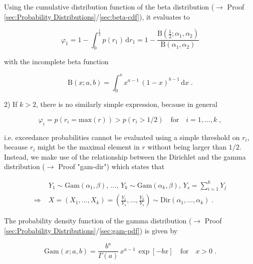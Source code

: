 \documentclass[a4paper,12pt,twoside]{book}
\begin{document}
Using the cumulative distribution function of the beta distribution ($\rightarrow$ Proof \ref{sec:Probability Distributions}/\ref{sec:beta-cdf}), it evaluates to

\begin{equation} \label{eq:dir-ep-Dir2-EP-qed}
\varphi_1 = 1 - \int_0^{\frac{1}{2}} p(r_1) \, \mathrm{d}r_1 = 1 - \frac{\mathrm{B}\left( \frac{1}{2};\alpha_1,\alpha_2 \right)}{\mathrm{B}(\alpha_1,\alpha_2)}
\end{equation}

with the incomplete beta function

\begin{equation} \label{eq:dir-ep-inc-beta-fct}
\mathrm{B}(x; a, b) = \int_0^x x^{a-1} \, (1-x)^{b-1} \, \mathrm{d}x \; .
\end{equation}

\vspace{1em}
2) If $k > 2$, there is no similarly simple expression, because in general

\begin{equation} \label{eq:dir-ep-Dir-EP-ineq}
\varphi_i = p(r_i = \mathrm{max}(r)) > p(r_i > 1/2) \quad \text{for} \quad i = 1, \ldots, k \; ,
\end{equation}

i.e. exceedance probabilities cannot be evaluated using a simple threshold on $r_i$, because $r_i$ might be the maximal element in $r$ without being larger than $1/2$. Instead, we make use of the relationship between the Dirichlet and the gamma distribution ($\rightarrow$ Proof "gam-dir") which states that

\begin{equation} \label{eq:dir-ep-Gam-Dir}
\begin{split}
& Y_1 \sim \mathrm{Gam}(\alpha_1,\beta), \, \ldots, \, Y_k \sim \mathrm{Gam}(\alpha_k,\beta), \, Y_s = \sum_{i=1}^k Y_j \\
\Rightarrow \; & X = (X_1, \ldots, X_k) = \left( \frac{Y_1}{Y_s}, \ldots, \frac{Y_k}{Y_s} \right) \sim \mathrm{Dir}(\alpha_1, \ldots, \alpha_k) \; .
\end{split}
\end{equation}

The probability density function of the gamma distribution ($\rightarrow$ Proof \ref{sec:Probability Distributions}/\ref{sec:gam-pdf}) is given by

\begin{equation} \label{eq:dir-ep-Gam-pdf}
\mathrm{Gam}(x; a, b) = \frac{ {b}^{a} }{\Gamma(a)} \, x^{a-1} \, \exp[-b x] \quad \text{for} \quad x > 0 \; .
\end{equation}
\end{document}
